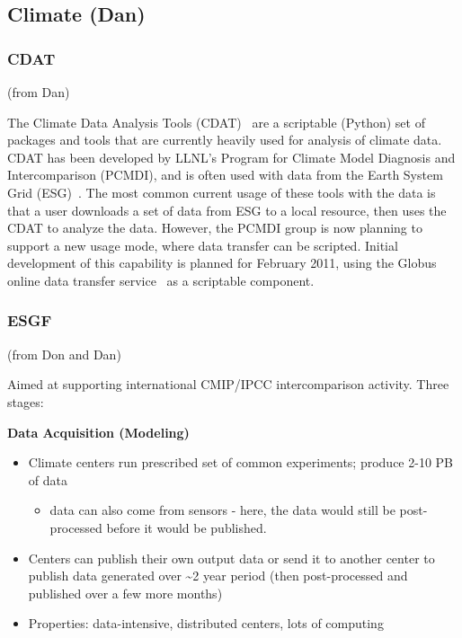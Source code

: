 \documentclass[preprint,12pt]{article}
\begin{document}
\subsection{Climate (Dan) \label{climateDan}}

\subsubsection{CDAT} (from Dan)

The Climate Data Analysis Tools (CDAT)~\cite{CDAT} are a scriptable
(Python) set of packages and tools that are currently heavily used for
analysis of climate data.  CDAT has been developed by LLNL's Program
for Climate Model Diagnosis and Intercomparison (PCMDI), and is often
used with data from the Earth System Grid (ESG)~\cite{ESG}.  The most
common current usage of these tools with the data is that a user
downloads a set of data from ESG to a local resource, then uses the
CDAT to analyze the data.  However, the PCMDI group is now planning to
support a new usage mode, where data transfer can be scripted.
Initial development of this capability is planned for February 2011,
using the Globus online data transfer service~\cite{globusOnline} as a
scriptable component.

\subsubsection{ESGF} (from Don and Dan)

Aimed at supporting international CMIP/IPCC intercomparison activity.
Three stages:

{\bf Data Acquisition (Modeling)}

\begin{itemize}
\item Climate centers run prescribed set of common experiments; produce 2-10 PB of data
\begin{itemize}
\item data can also come from sensors - here, the data would still be post-processed before it would be published.
\end{itemize}
\item Centers can publish their own output data or send it to another center to publish data generated over \~{}2 year period (then post-processed and published over a few more months)
\item Properties: data-intensive, distributed centers, lots of computing
\end{itemize}
\end{document}
